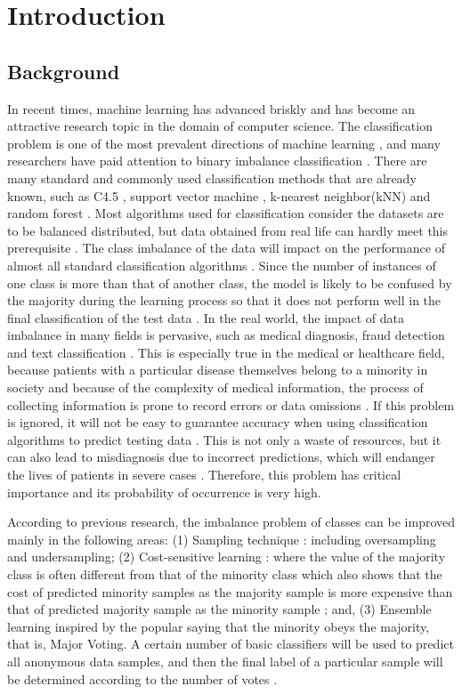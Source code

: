 \chapter{Introduction}

\section{Background}
In recent times, machine learning has advanced briskly and has become an attractive research topic in the domain of computer science. The classification problem is one of the most prevalent directions of machine learning \cite{11}, and many researchers have paid attention to binary imbalance classification \cite{90}. There are many standard and commonly used classification methods that are already known, such as C4.5 \cite{103}, support vector machine \cite{92}, k-nearest neighbor(kNN) \cite{75} and random forest \cite{39}. Most algorithms used for classification consider the datasets are to be balanced distributed, but data obtained from real life can hardly meet this prerequisite \cite{47}. The class imbalance of the data will impact on the performance of almost all standard classification algorithms \cite{11}. Since the number of instances of one class is more than that of another class, the model is likely to be confused by the majority during the learning process so that it does not perform well in the final classification of the test data \cite{17}. In the real world, the impact of data imbalance in many fields is pervasive, such as medical diagnosis, fraud detection and text classification \cite{47}. This is especially true in the medical or healthcare field, because patients with a particular disease themselves belong to a minority in society and because of the complexity of medical information, the process of collecting information is prone to record errors or data omissions \cite{5,7}. If this problem is ignored, it will not be easy to guarantee accuracy when using classification algorithms to predict testing data \cite{17}. This is not only a waste of resources, but it can also lead to misdiagnosis due to incorrect predictions, which will endanger the lives of patients in severe cases \cite{18,21}. Therefore, this problem has critical importance and its probability of occurrence is very high. 

According to previous research, the imbalance problem of classes can be improved mainly in the following areas: (1) Sampling technique \cite{9}: including oversampling and undersampling; (2) Cost-sensitive learning \cite{19}: where the value of the majority class is often different from that of the minority class which also shows that the cost of predicted minority samples as the majority sample is more expensive than that of predicted majority sample as the minority sample \cite{18}; and, (3) Ensemble learning \cite{33} inspired by the popular saying that the minority obeys the majority, that is, Major Voting. A certain number of basic classifiers will be used to predict all anonymous data samples, and then the final label of a particular sample will be determined according to the number of votes \cite{26}. 

